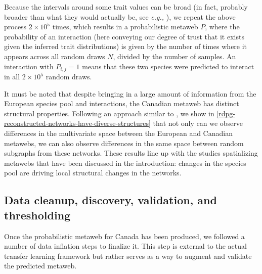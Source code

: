 Because the intervals around some trait values can be broad (in fact,
probably broader than what they would actually be, see \emph{e.g.,}
\cite{Garland1999IntPhy}), we repeat the above process \(2\times 10^5\)
times, which results in a probabilistic metaweb \(P\), where the
probability of an interaction (here conveying our degree of trust that
it exists given the inferred trait distributions) is given by the number
of times where it appears across all random draws \(N\), divided by the
number of samples. An interaction with \(P_{i,j} = 1\) means that these
two species were predicted to interact in all \(2\times 10^5\) random
draws.

It must be noted that despite bringing in a large amount of information
from the European species pool and interactions, the Canadian metaweb
has distinct structural properties. Following an approach similar to
\cite{Vermaat2009MajDim}, we show in \autoref{rdpg-reconstructed-networks-have-diverse-structures} that not only can we observe
differences in the multivariate space between the European and Canadian
metawebs, we can also observe differences in the same space between
random subgraphs from these networks. These results line up with the
studies spatializing metawebs that have been discussed in the
introduction: changes in the species pool are driving local structural
changes in the networks.

\subsection{Data cleanup, discovery, validation, and
thresholding}\label{data-cleanup-discovery-validation-and-thresholding}

Once the probabilistic metaweb for Canada has been produced, we followed
a number of data inflation steps to finalize it. This step is external
to the actual transfer learning framework but rather serves as a way to
augment and validate the predicted metaweb.

